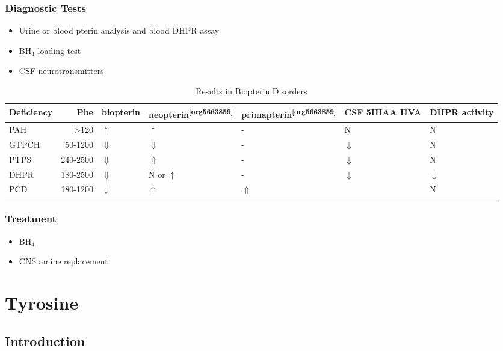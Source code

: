 \documentclass{scrartcl}
\begin{document}
\subsubsection{Diagnostic Tests}
\label{sec:orga6a3033}
\begin{itemize}
\item Urine or blood pterin analysis and blood DHPR assay
\item BH\(_{\text{4}}\) loading test
\item CSF neurotransmitters
\end{itemize}

\begin{table}[htbp]
\caption{\label{tab:orgf329b03}
Results in Biopterin Disorders}
\centering
\begin{tabular}{lrlllll}
Deficiency & Phe & biopterin\footnotemark & neopterin\textsuperscript{\ref{org5663859}} & primapterin\textsuperscript{\ref{org5663859}} & CSF 5HIAA HVA & DHPR activity\\
\hline
PAH & \textgreater{}120 & \(\uparrow\) & \(\uparrow\) & - & N & N\\
GTPCH & 50-1200 & \(\Downarrow\) & \(\Downarrow\) & - & \(\downarrow\) & N\\
PTPS & 240-2500 & \(\Downarrow\) & \(\Uparrow\) & - & \(\downarrow\) & N\\
DHPR & 180-2500 & \(\Downarrow\) & N or \(\uparrow\) & - & \(\downarrow\) & \(\downarrow\)\\
PCD & 180-1200 & \(\downarrow\) & \(\uparrow\) & \(\Uparrow\) &  & N\\
\end{tabular}
\end{table}

\subsubsection{Treatment}
\label{sec:org07dfd7e}
\begin{itemize}
\item BH\(_{\text{4}}\)
\item CNS amine replacement
\end{itemize}

\section{Tyrosine}
\label{sec:org0e034ac}
\subsection{Introduction}
\label{sec:orgfaedb2b}
\end{document}
